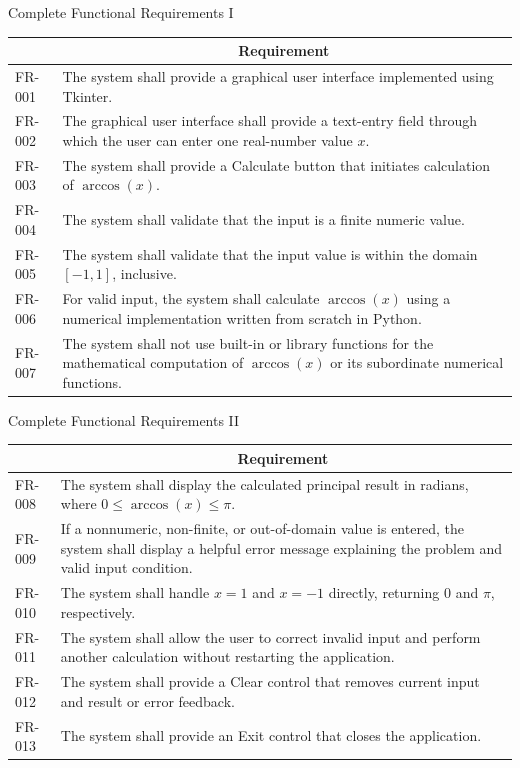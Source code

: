 \documentclass[aspectratio=169]{beamer}
\newcommand{\tableheader}[1]{%
    \multicolumn{1}{c}{\color{white}\textbf{#1}}%
}
\begin{document}
\begin{frame}{Complete Functional Requirements I}
\scriptsize
{}
\begin{tabular}{p{}p{}}
\rowcolor{navy}
\tableheader{ID} & \tableheader{Requirement} \\
\toprule
FR-001 & The system shall provide a graphical user interface implemented using Tkinter. \\
FR-002 & The graphical user interface shall provide a text-entry field through which the user can enter one real-number value \(x\). \\
FR-003 & The system shall provide a Calculate button that initiates calculation of \(\arccos(x)\). \\
FR-004 & The system shall validate that the input is a finite numeric value. \\
FR-005 & The system shall validate that the input value is within the domain \([-1,1]\), inclusive. \\
FR-006 & For valid input, the system shall calculate \(\arccos(x)\) using a numerical implementation written from scratch in Python. \\
FR-007 & The system shall not use built-in or library functions for the mathematical computation of \(\arccos(x)\) or its subordinate numerical functions. \\
\bottomrule
\end{tabular}
\end{frame}

\begin{frame}{Complete Functional Requirements II}
\scriptsize
{}
\begin{tabular}{p{}p{}}
\rowcolor{navy}
\tableheader{ID} & \tableheader{Requirement} \\
\toprule
FR-008 & The system shall display the calculated principal result in radians, where \(0 \leq \arccos(x) \leq \pi\). \\
FR-009 & If a nonnumeric, non-finite, or out-of-domain value is entered, the system shall display a helpful error message explaining the problem and valid input condition. \\
FR-010 & The system shall handle \(x=1\) and \(x=-1\) directly, returning \(0\) and \(\pi\), respectively. \\
FR-011 & The system shall allow the user to correct invalid input and perform another calculation without restarting the application. \\
FR-012 & The system shall provide a Clear control that removes current input and result or error feedback. \\
FR-013 & The system shall provide an Exit control that closes the application. \\
\bottomrule
\end{tabular}
\end{frame}
\end{document}
